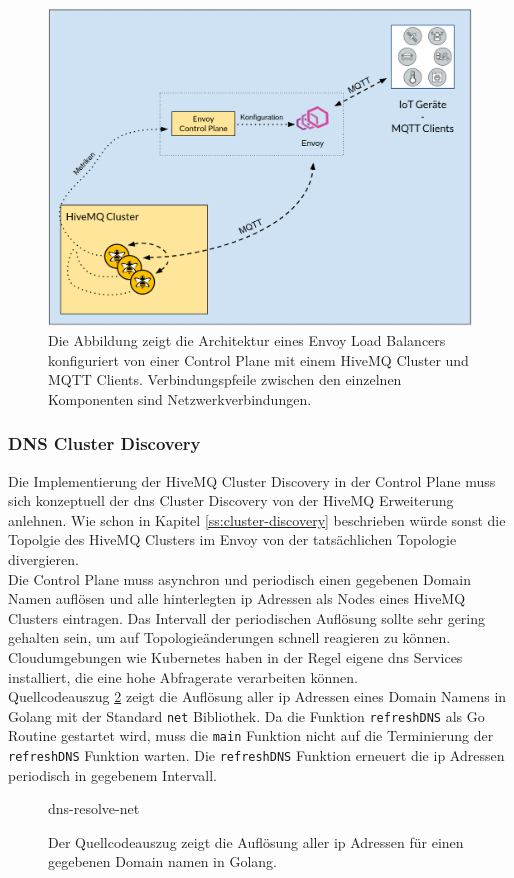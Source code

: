 \begin{figure}
    \centering
    \includegraphics[scale=0.36]{images/control-plane-architecture.png}
    \caption{Die Abbildung zeigt die Architektur eines Envoy Load Balancers konfiguriert von einer Control Plane mit einem HiveMQ Cluster und MQTT Clients. Verbindungspfeile zwischen den einzelnen Komponenten sind Netzwerkverbindungen.}
    \label{fig:control-plane-architecture}
\end{figure}

\subsubsection{DNS Cluster Discovery} \label{ss:dns-discovery}
Die Implementierung der HiveMQ Cluster Discovery in der Control Plane muss sich konzeptuell der \ac{dns} Cluster Discovery von der HiveMQ Erweiterung anlehnen. Wie schon in Kapitel \ref{ss:cluster-discovery} beschrieben würde sonst die Topolgie des HiveMQ Clusters im Envoy von der tatsächlichen Topologie divergieren.
\\
Die Control Plane muss asynchron und periodisch einen gegebenen Domain Namen auflösen und alle hinterlegten \ac{ip} Adressen als Nodes eines HiveMQ Clusters eintragen. Das Intervall der periodischen Auflösung sollte sehr gering gehalten sein, um auf Topologieänderungen schnell reagieren zu können.
Cloudumgebungen wie Kubernetes haben in der Regel eigene \ac{dns} Services installiert, die eine hohe Abfragerate verarbeiten können.
\\
Quellcodeauszug \ref{code:dns-resolve-net} zeigt die Auflösung aller \ac{ip} Adressen eines Domain Namens in Golang mit der Standard \verb|net| Bibliothek. Da die Funktion \verb|refreshDNS| als Go Routine gestartet wird, muss die \verb|main| Funktion nicht auf die Terminierung der \verb|refreshDNS| Funktion warten. Die \verb|refreshDNS| Funktion erneuert die \ac{ip} Adressen periodisch in gegebenem Intervall.
\begin{figure}
    {dns-resolve-net}
    \caption{Der Quellcodeauszug zeigt die Auflösung aller \ac{ip} Adressen für einen gegebenen Domain namen in Golang.}
    \label{code:dns-resolve-net}
\end{figure}

